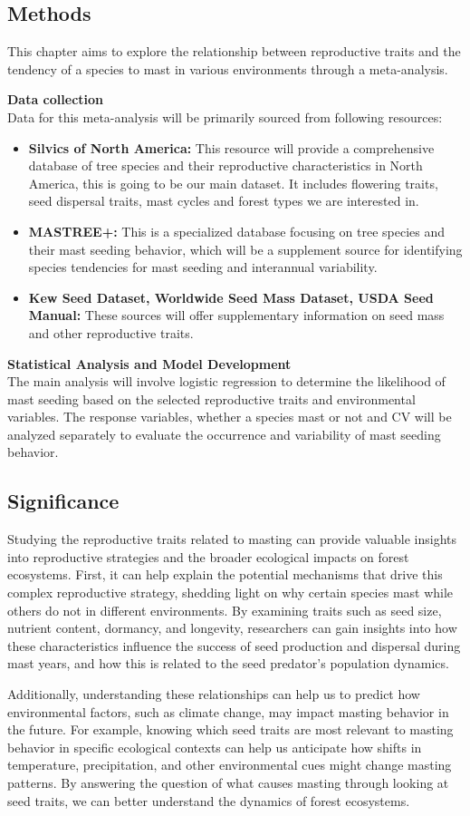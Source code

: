 \documentclass[11pt,letter]{article}
\begin{document}
\subsection{Methods}
This chapter aims to explore the relationship between reproductive traits and the tendency of a species to mast in various environments through a meta-analysis.\par
\textbf{Data collection}\\
Data for this meta-analysis will be primarily sourced from following resources:
	\begin{itemize}
	\item \textbf{Silvics of North America:} This resource will provide a comprehensive database of tree species and their reproductive characteristics in North America, this is going to be our main dataset. It includes flowering traits, seed dispersal traits, mast cycles and forest types we are interested in.
	\item \textbf{MASTREE+:} This is a specialized database focusing on tree species and their mast seeding behavior, which will be a supplement source for identifying species tendencies for mast seeding and interannual variability.
	\item \textbf{Kew Seed Dataset, Worldwide Seed Mass Dataset, USDA Seed Manual:} These sources will offer supplementary information on seed mass and other reproductive traits.
	\end{itemize}
\textbf{Statistical Analysis and Model Development}\\
The main analysis will involve logistic regression to determine the likelihood of mast seeding based on the selected reproductive traits and environmental variables. The response variables, whether a species mast or not and CV will be analyzed separately to evaluate the occurrence and variability of mast seeding behavior.
\subsection{Significance} 
Studying the reproductive traits related to masting can provide valuable insights into reproductive strategies and the broader ecological impacts on forest ecosystems. First, it can help explain the potential mechanisms that drive this complex reproductive strategy, shedding light on why certain species mast while others do not in different environments. By examining traits such as seed size, nutrient content, dormancy, and longevity, researchers can gain insights into how these characteristics influence the success of seed production and dispersal during mast years, and how this is related to the seed predator's population dynamics.\par
Additionally, understanding these relationships can help us to predict how environmental factors, such as climate change, may impact masting behavior in the future. For example, knowing which seed traits are most relevant to masting behavior in specific ecological contexts can help us anticipate how shifts in temperature, precipitation, and other environmental cues might change masting patterns. By answering the question of what causes masting through looking at seed traits, we can better understand the dynamics of forest ecosystems.\par
\end{document}
